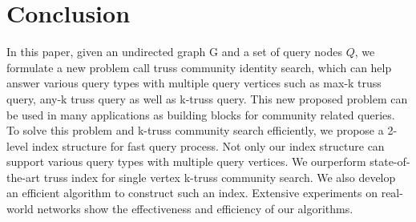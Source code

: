 \section{Conclusion}
\label{conclusion}

In this paper, given an undirected graph G and a set of query nodes $Q$, we formulate a new problem call truss community identity search, which can help answer various query types with multiple query vertices such as max-k truss query, any-k truss query as well as k-truss query. This new proposed problem can be used in many applications as building blocks for community related queries. To solve this problem and k-truss community search efficiently, we propose a 2-level index structure for fast query process. Not only our index structure can support various query types with multiple query vertices. We ourperform state-of-the-art truss index for single vertex k-truss community search. We also develop an efficient algorithm to construct such an index. Extensive experiments on real-world networks show the effectiveness and efficiency of our algorithms. 

